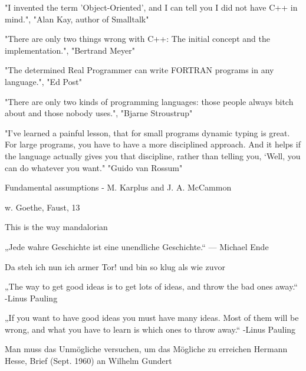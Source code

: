 "I invented the term 'Object-Oriented', and I can tell you I did not have C++ in mind.",
          "Alan Kay, author of Smalltalk"
          
"There are only two things wrong with C++:  The initial concept and the implementation.",
          "Bertrand Meyer"
      
"The determined Real Programmer can write FORTRAN programs in any language.", "Ed Post"

"There are only two kinds of programming languages: those people always bitch about and those nobody uses.",
          "Bjarne Stroustrup" 
          
 "I’ve learned a painful lesson, that for small programs dynamic typing is great. For large programs, you have to have a more disciplined approach. And it helps if the language actually gives you that discipline, rather than telling you, ‘Well, you can do whatever you want." "Guido van Rossum"         
          
{Fundamental assumptions - M. Karplus  and J. A. McCammon \cite{Karplus2002}}




{w. Goethe, Faust, 13 }

This is the way
mandalorian

„Jede wahre Geschichte ist eine unendliche Geschichte.“ — Michael Ende

Da steh ich nun ich armer Tor! und bin so klug als wie zuvor




„The way to get good ideas is to get lots of ideas, and throw the bad ones away.“
-Linus Pauling

„If you want to have good ideas you must have many ideas. Most of them will be wrong, and what you have to learn is which ones to throw away.“
-Linus Pauling

Man muss das Unmögliche versuchen, um das Mögliche zu erreichen
Hermann Hesse, Brief (Sept. 1960) an Wilhelm Gundert

